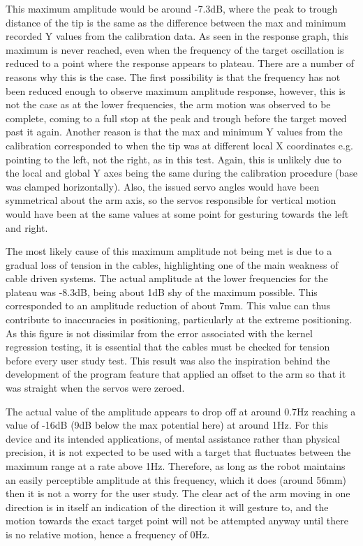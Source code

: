 \documentclass[11pt]{article}
\begin{document}
This maximum amplitude would be around -7.3dB, where the peak to trough distance of the tip is the same as the difference between the max and minimum recorded Y values from the calibration data. As seen in the response graph, this maximum is never reached, even when the frequency of the target oscillation is reduced to a point where the response appears to plateau. There are a number of reasons why this is the case. The first possibility is that the frequency has not been reduced enough to observe maximum amplitude response, however, this is not the case as at the lower frequencies, the arm motion was observed to be complete, coming to a full stop at the peak and trough before the target moved past it again. Another reason is that the max and minimum Y values from the calibration corresponded to when the tip was at different local X coordinates e.g. pointing to the left, not the right, as in this test. Again, this is unlikely due to the local and global Y axes being the same during the calibration procedure (base was clamped horizontally). Also, the issued servo angles would have been symmetrical about the arm axis, so the servos responsible for vertical motion would have been at the same values at some point for gesturing towards the left and right. 

The most likely cause of this maximum amplitude not being met is due to a gradual loss of tension in the cables, highlighting one of the main weakness of cable driven systems. The actual amplitude at the lower frequencies for the plateau was -8.3dB, being about 1dB shy of the maximum possible. This corresponded to an amplitude reduction of about 7mm. This value can thus contribute to inaccuracies in positioning, particularly at the extreme positioning. As this figure is not dissimilar from the error associated with the kernel regression testing, it is essential that the cables must be checked for tension before every user study test. This result was also the inspiration behind the development of the program feature that applied an offset to the arm so that it was straight when the servos were zeroed.

The actual value of the amplitude appears to drop off at around 0.7Hz reaching a value of -16dB (9dB below the max potential here) at around 1Hz. For this device and its intended applications, of mental assistance rather than physical precision, it is not expected to be used with a target that fluctuates between the maximum range at a rate above 1Hz. Therefore, as long as the robot maintains an easily perceptible amplitude at this frequency, which it does (around 56mm) then it is not a worry for the user study. The clear act of the arm moving in one direction is in itself an indication of the direction it will gesture to, and the motion towards the exact target point will not be attempted anyway until there is no relative motion, hence a frequency of 0Hz.
\end{document}
